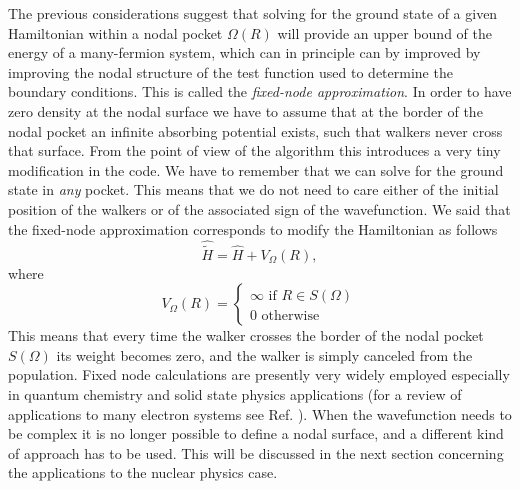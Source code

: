 The previous considerations suggest that solving  for the ground state of a given Hamiltonian within a nodal pocket $\Omega(R)$ will provide an upper bound of the energy of a many-fermion system, which can in principle can by improved by improving the nodal structure of the test function used to determine the boundary conditions. This is called the {\it fixed-node approximation}. In order to have zero density at the nodal surface we have to assume that at the border of the nodal pocket an infinite absorbing potential exists, such that walkers never cross that surface. From the point of view of the algorithm this introduces a very tiny modification in the code. We have to remember that we can solve for the ground state in {\it any} pocket. This means that we do not need to care either of the initial position of the walkers or of the associated sign of the wavefunction. We said that the fixed-node approximation corresponds to modify the Hamiltonian as follows
\begin{equation}
\hat{\tilde{H}}=\hat{H}+V_\Omega(R),
\end{equation}  
where
\begin{equation}
V_\Omega(R)=\left\{ 
\begin{array}{ll}
\infty \text{\ \ \ if\ \ \ }R\in S(\Omega)\\
0\text{\ \ \ \ otherwise}
\end{array}
 \right.
\end{equation}
 This means that every time the walker crosses the border of the nodal pocket $S(\Omega)$ its weight becomes zero, and the walker is simply canceled from the population. Fixed node calculations are presently very widely employed especially in quantum chemistry and solid state physics applications (for a review of applications to many electron systems see Ref. \cite{Foulkes01}). When the wavefunction needs to be complex it is no longer possible to define a nodal surface, and a different kind of approach has to be used. This will be discussed in the next section concerning the applications to the nuclear physics case.
